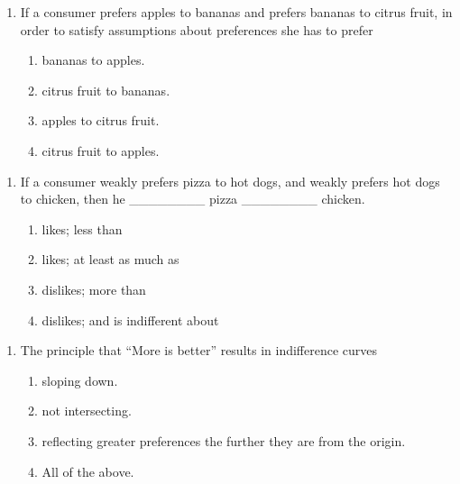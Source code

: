 \documentclass[11pt,]{article}
\providecommand{\tightlist}{%
  \setlength{\itemsep}{0pt}\setlength{\parskip}{0pt}}
\begin{document}
\begin{enumerate}
\def\labelenumi{\arabic{enumi})}
\setcounter{enumi}{2}
\tightlist
\item
  If a consumer prefers apples to bananas and prefers bananas to citrus
  fruit, in order to satisfy assumptions about preferences she has to
  prefer

  \begin{enumerate}
  \def\labelenumii{\Alph{enumii})}
  \tightlist
  \item
    bananas to apples.
  \item
    citrus fruit to bananas.
  \item
    apples to citrus fruit.
  \item
    citrus fruit to apples.
  \end{enumerate}
\end{enumerate}

\begin{enumerate}
\def\labelenumi{\arabic{enumi})}
\setcounter{enumi}{3}
\tightlist
\item
  If a consumer weakly prefers pizza to hot dogs, and weakly prefers hot
  dogs to chicken, then he \_\_\_\_\_\_\_\_ pizza \_\_\_\_\_\_\_\_
  chicken.

  \begin{enumerate}
  \def\labelenumii{\Alph{enumii})}
  \tightlist
  \item
    likes; less than
  \item
    likes; at least as much as
  \item
    dislikes; more than
  \item
    dislikes; and is indifferent about
  \end{enumerate}
\end{enumerate}

\begin{enumerate}
\def\labelenumi{\arabic{enumi})}
\setcounter{enumi}{4}
\tightlist
\item
  The principle that ``More is better'' results in indifference curves

  \begin{enumerate}
  \def\labelenumii{\Alph{enumii})}
  \tightlist
  \item
    sloping down.
  \item
    not intersecting.
  \item
    reflecting greater preferences the further they are from the origin.
  \item
    All of the above.
  \end{enumerate}
\end{enumerate}
\end{document}
